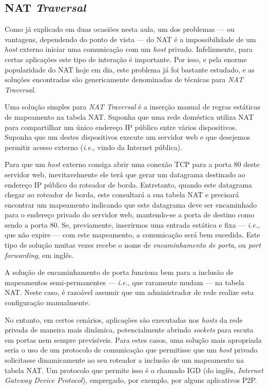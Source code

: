 \documentclass{article}
\begin{document}
\subsection{NAT \textit{Traversal}}

Como já explicado em duas ocasiões nesta aula, um dos problemas --- ou vantagens, dependendo do ponto de vista --- do NAT é a impossibilidade de um \textit{host} externo iniciar uma comunicação com um \textit{host} privado. Infelizmente, para certas aplicações este tipo de interação é importante. Por isso, e pela enorme popularidade do NAT hoje em dia, este problema já foi bastante estudado, e as soluções encontradas são genericamente denominadas de técnicas para \textit{NAT Traversal}.

Uma solução simples para \textit{NAT Traversal} é a inserção manual de regras estáticas de mapeamento na tabela NAT. Suponha que uma rede doméstica utiliza NAT para compartilhar um único endereço IP público entre vários dispositivos. Suponha que um destes dispositivos execute um servidor web e que desejemos permitir acesso externo (\textit{i.e.}, vindo da Internet pública). 

Para que um \textit{host} externo consiga abrir uma conexão TCP para a porta 80 deste servidor web, inevitavelmente ele terá que gerar um datagrama destinado ao endereço IP público do roteador de borda. Entretanto, quando este datagrama chegar ao roteador de borda, este consultará a sua tabela NAT e precisará encontrar um mapeamento indicando que este datagrama deve ser encaminhado para o endereço privado do servidor web, mantendo-se a porta de destino como sendo a porta 80. Se, previamente, inserirmos uma entrada estática e fixa --- \textit{i.e.}, que não expire --- com este mapeamento, a comunicação será bem sucedida. Este tipo de solução muitas vezes recebe o nome de \textit{encaminhamento de porta}, ou \textit{port forwarding}, em inglês.

A solução de encaminhamento de porta funciona bem para a inclusão de mapeamentos semi-permanentes --- \textit{i.e.}, que raramente mudam --- na tabela NAT. Neste caso, é razoável assumir que um administrador de rede realize esta configuração manualmente.

No entanto, em certos cenários, aplicações são executadas nos \textit{hosts} da rede privada de maneira mais dinâmica, potencialmente abrindo \textit{sockets} para escuta em portas nem sempre previsíveis. Para estes casos, uma solução mais apropriada seria o uso de um protocolo de comunicação que permitisse que um \textit{host} privado solicitasse dinamicamente ao seu roteador a inclusão de um mapeamento na tabela NAT. Um protocolo que permite isso é o chamado IGD (do inglês, \textit{Internet Gateway Device Protocol}), empregado, por exemplo, por alguns aplicativos P2P.
\end{document}
